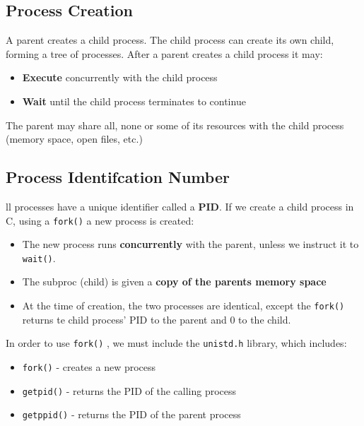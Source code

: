 \documentclass[a4paper, 10pt]{article}
\begin{document}
\pagebreak
\subsection{Process Creation}
A parent creates a child process. The child process can create its own child, forming a tree of processes. After a parent creates a child process it may:
\begin{itemize}
    \item \textbf{Execute} concurrently with the child process
    \item \textbf{Wait} until the child process terminates to continue
\end{itemize}
The parent may share all, none or some of its resources with the child process (memory space, open files, etc.)
\subsection{Process Identifcation Number}
ll processes have a unique identifier called a \textbf{PID}. If we create a child process in C, using a \texttt{fork()} a new process is created:
\begin{itemize}
    \item The new process runs \textbf{concurrently} with the parent, unless we instruct it to \texttt{wait()}.
    \item The subproc (child) is given a \textbf{copy of the parents memory space}
    \item At the time of creation, the two processes are identical, except the \texttt{fork()} returns te child process' PID to the parent and 0 to the child.
\end{itemize}
In order to use \texttt{fork()} , we must include the \texttt{unistd.h} library, which includes:
\begin{itemize}
    \item \texttt{fork()} - creates a new process
    \item \texttt{getpid()} - returns the PID of the calling process
    \item \texttt{getppid()} - returns the PID of the parent process
\end{itemize}
\end{document}
